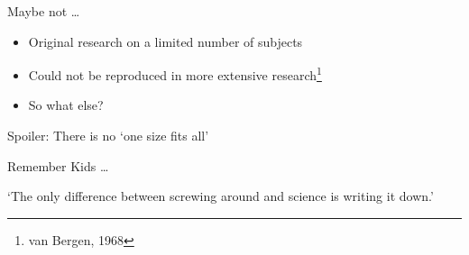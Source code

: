 \documentclass[aspectratio=169]{beamer}
\begin{document}
    {
    \begin{frame}{Maybe not \ldots}
        \begin{itemize}
            \item Original research on a limited number of subjects
            \item Could not be reproduced in more extensive research\footnote{van Bergen, 1968}
            \item So what else?
        \end{itemize}
    \end{frame}
    }

    \begin{frame}[standout]
        Spoiler: There is no `one size fits all'
    \end{frame}

    {
    \begin{frame}{Remember Kids \ldots}
        \begin{titlebox}
            \centering
            `The only difference between screwing around and science is \alert{writing it down}.'
        \end{titlebox}
    \end{frame}
    }
\end{document}

